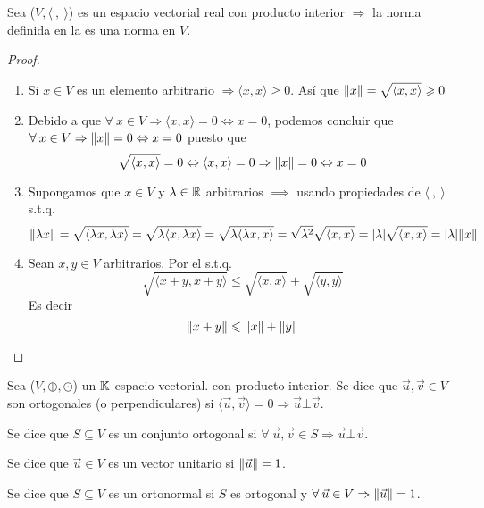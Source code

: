 \begin{theorem}
     Sea ($V, \langle \: , \: \rangle$) es un espacio vectorial real con producto interior $\Rightarrow$ la norma definida en la  es una norma en $V$.
    
\end{theorem}

\begin{proof}
    \begin{enumerate}[label=(\subscript{N}{{\arabic*}})]
    \item Si $x \in V$ es un elemento arbitrario $\Rightarrow \langle x, x \rangle \geqslant 0$. Así que $\norm{x} = \sqrt{\langle x,x \rangle} \geqslant 0$
    \item Debido a que $\forall \: x \in V \Rightarrow \langle x, x \rangle = 0 \iff x = 0$, podemos concluir que $\forall \: x \in V \Rightarrow \norm{x} = 0 \Leftrightarrow x = 0$ puesto que 
    \begin{equation*}
        \sqrt{\langle x,x \rangle} = 0 \Leftrightarrow \langle x,x \rangle = 0 \Rightarrow \norm{x} = 0 \Leftrightarrow x = 0
    \end{equation*}
    \item Supongamos que $x \in V$ y $\lambda \in \mathbb{R}$ arbitrarios $\implies$ usando propiedades de $\langle \: , \: \rangle$ s.t.q.
    \begin{equation*}
        \norm{\lambda x} = \sqrt{\langle \lambda x,\lambda x \rangle} = \sqrt{\lambda  \langle x, \lambda  x \rangle} = \sqrt{\lambda  \langle \lambda x,   x \rangle} = \sqrt{\lambda^2} \sqrt{\langle x,x \rangle} = \abs{\lambda} \sqrt{\langle x,x \rangle} = \abs{\lambda} \norm{x}
    \end{equation*}
    \item Sean $x,y \in V$ arbitrarios. Por el  s.t.q.
    \begin{equation*}
        \sqrt{\langle x + y, x + y \rangle} \leqslant \sqrt{\langle x,x \rangle} + \sqrt{\langle y,y \rangle}
    \end{equation*}
    Es decir
    \begin{equation*}
        \norm{x+y} \leqslant \norm{x} + \norm{y}
    \end{equation*}
    \end{enumerate}
\end{proof}

\begin{definition}
    Sea  ($V, \oplus, \odot$) un $\mathbb{K}$-espacio vectorial. con producto interior. Se dice que $\vec{u}, \vec{v} \in V$ son ortogonales (o perpendiculares)  si $\langle \vec{u}, \vec{v} \rangle=0 \Rightarrow \vec{u} \bot \vec{v}$. 
    
    Se dice que $S \subseteq V$ es un conjunto ortogonal si $\forall  \: \vec{u}, \vec{v} \in S \Rightarrow \vec{u} \bot \vec{v}$. 
    
    Se dice que $\vec{u} \in V$ es un vector unitario si $\norm{\vec{u}}=1$. 
    
    Se dice que $S \subseteq V$ es un ortonormal si $S$ es ortogonal y $\forall \: \vec{u} \in V \Rightarrow \norm{\vec{u}}=1 $. 
\end{definition}

